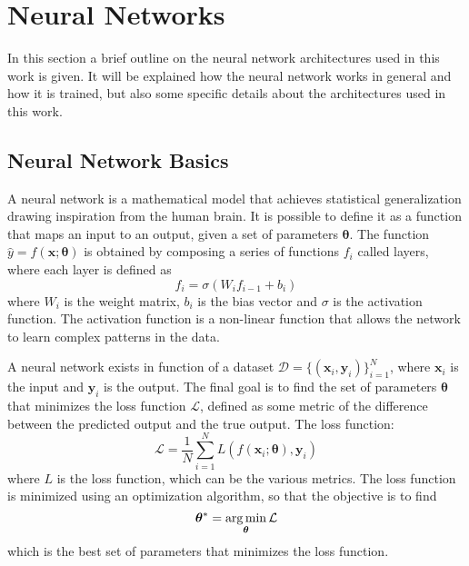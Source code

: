 \section{Neural Networks}
\label{sec:neural_network}

In this section a brief outline on the neural network architectures used in this work is given. It will be explained how the neural network works in general and how it is trained, but also some specific details about the architectures used in this work. 

\subsection{Neural Network Basics}

A neural network is a mathematical model that achieves statistical generalization drawing inspiration from the human brain. It is possible to define it as a function that maps an input to an output, given a set of parameters \( \bm{\theta} \). The function \( \hat{y} = f(\bm{x}; \bm{\theta}) \) is obtained by composing a series of functions \( f_i \) called layers, where each layer is defined as
\begin{equation}
    f_i = \sigma(W_i f_{i-1} + b_i)
\end{equation}
where \( W_i \) is the weight matrix, \( b_i \) is the bias vector and \( \sigma \) is the activation function. The activation function is a non-linear function that allows the network to learn complex patterns in the data. 

A neural network exists in function of a dataset \( \mathcal{D} = \{(\bm{x}_i, \bm{y}_i)\}_{i=1}^N \), where \( \bm{x}_i \) is the input and \( \bm{y}_i \) is the output. The final goal is to find the set of parameters \( \bm{\theta} \) that minimizes the loss function \( \mathcal{L} \), defined as some metric of the difference between the predicted output and the true output. The loss function:
\begin{equation}
    \mathcal{L} = \frac{1}{N} \sum_{i=1}^N L(f(\bm{x}_i; \bm{\theta}), \bm{y}_i)
\end{equation}
where \( L \) is the loss function, which can be the various metrics. The loss function is minimized using an optimization algorithm, so that the objective is to find
\begin{equation}
    \bm{\theta}^* = \operatorname*{arg\,min}_{\bm{\theta}} \mathcal{L}
\end{equation}
which is the best set of parameters that minimizes the loss function.

